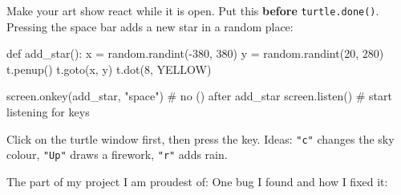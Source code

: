\documentclass[level=1]{kidscode}
\begin{document}
\begin{stretchchallenge}
Make your art show react while it is open. Put this \textbf{before} \texttt{turtle.done()}.
Pressing the space bar adds a new star in a random place:
\begin{pycode}
def add_star():
    x = random.randint(-380, 380)
    y = random.randint(20, 280)
    t.penup()
    t.goto(x, y)
    t.dot(8, YELLOW)

screen.onkey(add_star, "space")   # no () after add_star
screen.listen()                   # start listening for keys
\end{pycode}
Click on the turtle window first, then press the key. Ideas: \texttt{"c"} changes the sky colour,
\texttt{"Up"} draws a firework, \texttt{"r"} adds rain.
\end{stretchchallenge}

\begin{reflection}
The part of my project I am proudest of:
One bug I found and how I fixed it:
\end{reflection}
\end{document}
